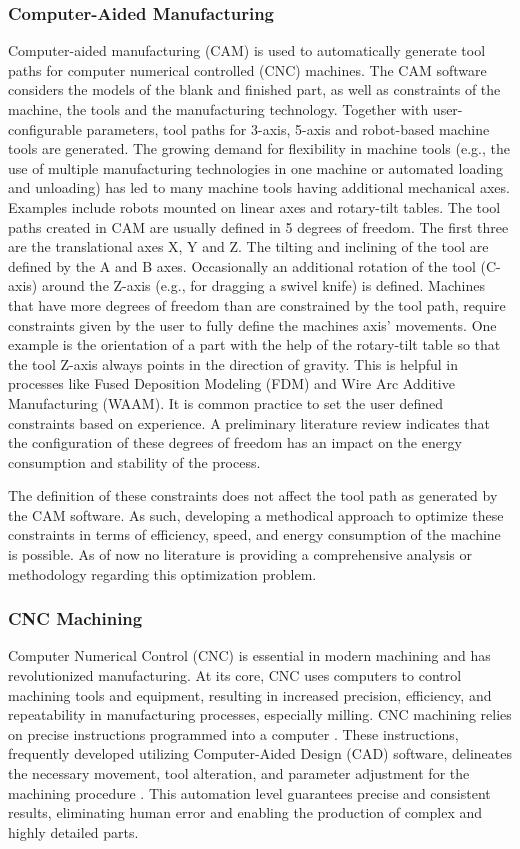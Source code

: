 \documentclass[ZLstudentexpose%
              ,optBiber%
              ,optEnglish%
              ,10pt
              ]{ZLlatex}%
\begin{document}
\subsubsection{Computer-Aided Manufacturing}\label{CAM}
Computer-aided manufacturing (CAM) is used to automatically generate tool paths for computer numerical controlled (CNC) machines. The CAM software considers the models of the blank and finished part, as well as constraints of the machine, the tools and the manufacturing technology. Together with user-configurable parameters, tool paths for 3-axis, 5-axis and robot-based machine tools are generated.
The growing demand for flexibility in machine tools (e.g., the use of multiple manufacturing technologies in one machine or automated loading and unloading) has led to many machine tools having additional mechanical axes. Examples include robots mounted on linear axes and rotary-tilt tables.
The tool paths created in CAM are usually defined in 5 degrees of freedom. The first three are the translational axes X, Y and Z. The tilting and inclining of the tool are defined by the A and B axes. Occasionally an additional rotation of the tool (C-axis) around the Z-axis (e.g., for dragging a swivel knife) is defined.
Machines that have more degrees of freedom than are constrained by the tool path, require constraints given by the user to fully define the machines axis’ movements. One example is the orientation of a part with the help of the rotary-tilt table so that the tool Z-axis always points in the direction of gravity. This is helpful in processes like Fused Deposition Modeling (FDM) and Wire Arc Additive Manufacturing (WAAM). 
It is common practice to set the user defined constraints based on experience. A preliminary literature review indicates that the configuration of these degrees of freedom has an impact on the energy consumption and stability of the process.

The definition of these constraints does not affect the tool path as generated by the CAM software. As such, developing a methodical approach to optimize these constraints in terms of efficiency, speed, and energy consumption of the machine is possible. As of now no literature is providing a comprehensive analysis or methodology regarding this optimization problem.


\subsubsection{CNC Machining}
Computer Numerical Control (CNC) is essential in modern machining and has revolutionized manufacturing. At its core, CNC uses computers to control machining tools and equipment, resulting in increased precision, efficiency, and repeatability in manufacturing processes, especially milling. CNC machining relies on precise instructions programmed into a computer \cite{Altintas.2001}. These instructions, frequently developed utilizing Computer-Aided Design (CAD) software, delineates the necessary movement, tool alteration, and parameter adjustment for the machining procedure \cite{Klancnik.2016}. This automation level guarantees precise and consistent results, eliminating human error and enabling the production of complex and highly detailed parts.
\end{document}
